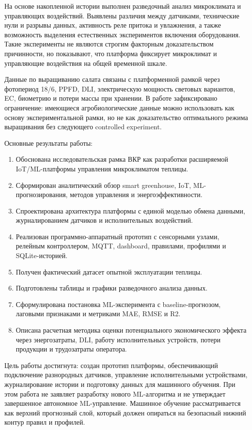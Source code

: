 \documentclass[a4paper,14pt]{extarticle}
\providecommand{\tightlist}{%
  \setlength{\itemsep}{0pt}\setlength{\parskip}{0pt}}
\begin{document}
На основе накопленной истории выполнен разведочный анализ микроклимата и
управляющих воздействий. Выявлены различия между датчиками, технические
нули и разрывы данных, активность реле притока и увлажнения, а также
возможность выделения естественных экспериментов включения оборудования.
Такие эксперименты не являются строгим факторным доказательством
причинности, но показывают, что платформа фиксирует микроклимат и
управляющие воздействия на общей временной шкале.

Данные по выращиванию салата связаны с платформенной рамкой через
фотопериод 18/6, PPFD, DLI, электрическую мощность световых вариантов,
EC, биометрию и потери массы при хранении. В работе зафиксировано
ограничение: имеющиеся агробиологические данные можно использовать как
основу экспериментальной рамки, но не как доказательство оптимального
режима выращивания без следующего controlled experiment.

Основные результаты работы:

\begin{enumerate}
\def\labelenumi{\arabic{enumi})}
\tightlist
\item
  Обоснована исследовательская рамка ВКР как разработки расширяемой
  IoT/ML-платформы управления микроклиматом теплицы.
\item
  Сформирован аналитический обзор smart greenhouse, IoT,
  ML-прогнозирования, методов управления и энергоэффективности.
\item
  Спроектирована архитектура платформы с единой моделью обмена данными,
  журналированием датчиков и исполнительных воздействий.
\item
  Реализован программно-аппаратный прототип с сенсорными узлами,
  релейным контроллером, MQTT, dashboard, правилами, профилями и
  SQLite-историей.
\item
  Получен фактический датасет опытной эксплуатации теплицы.
\item
  Подготовлены таблицы и графики разведочного анализа данных.
\item
  Сформулирована постановка ML-эксперимента с baseline-прогнозом,
  лаговыми признаками и метриками MAE, RMSE и R2.
\item
  Описана расчетная методика оценки потенциального экономического
  эффекта через энергозатраты, DLI, работу исполнительных устройств,
  потери продукции и трудозатраты оператора.
\end{enumerate}

Цель работы достигнута: создан прототип платформы, обеспечивающий
подключение разнородных датчиков, управление исполнительными
устройствами, журналирование истории и подготовку данных для машинного
обучения. При этом работа не заявляет разработку нового ML-алгоритма и
не утверждает завершенное автономное ML-управление. Машинное обучение
рассматривается как верхний прогнозный слой, который должен опираться на
безопасный нижний контур правил и профилей.
\end{document}
